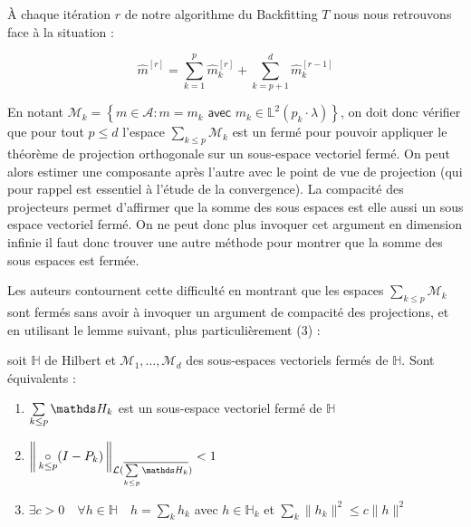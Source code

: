 {    \noindent À chaque itération $r$ de notre algorithme du Backfitting $T$ nous nous retrouvons face à la situation : 
    
    \begin{equation*}
        \widehat m^{[r]} = \sum_{k=1}^p \widehat m_k^{[r]} + \sum_{k=p+1}^d \widehat m_k^{[r-1]}
    \end{equation*}

    \noindent En notant $\mathcal M_k = \left\{ m \in \mathcal A : m = m_k \textsf{ avec } m_k \in \mathds L^2(p_k \cdot \lambda) \right\}$, on doit donc vérifier que pour tout $p \leq d$ l'espace $\sum_{k\leq p} \mathcal M_k$ est un fermé pour pouvoir appliquer le théorème de projection orthogonale sur un sous-espace vectoriel fermé. On peut alors estimer une composante après l'autre avec le point de vue de projection (qui pour rappel est essentiel à l'étude de la convergence). La compacité des projecteurs permet d'affirmer que la somme des sous espaces est elle aussi un sous espace vectoriel fermé. On ne peut donc plus invoquer cet argument en dimension infinie il faut donc trouver une autre méthode pour montrer que la somme des sous espaces est fermée.

    \bigskip

    \noindent Les auteurs contournent cette difficulté en montrant que les espaces $\sum_{k\leq p} \mathcal M_k$ sont fermés sans avoir à invoquer un argument de compacité des projections, et en utilisant le lemme suivant, plus particulièrement (3) :

    \begin{lem*}
        soit $\mathds H$ de Hilbert et $\mathcal M_1, \dots, \mathcal M_d$ des sous-espaces vectoriels fermés de $\mathds H$.
        Sont équivalents :
        \begin{enumerate}
            \item $\sum\limits_{k\leq p} \mathcal \mathds H_k$ est un sous-espace vectoriel fermé de $\mathds H$
            \item $\displaystyle\norme{\mathcal L( \overline{\sum\limits_{k\leq p} \mathcal \mathds H_k})} {\underset{k\leq p}\circ(I-P_k)} < 1$
            \item $\exists c > 0 \quad \forall h \in \mathds H \quad h = \sum_k h_k$ avec $h \in \mathds H_k$ et $\sum_k \lVert h_k \rVert^2 \leq c \lVert h \rVert^2$
        \end{enumerate}
    \end{lem*}




}